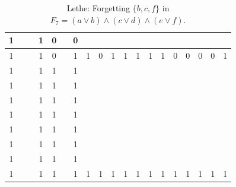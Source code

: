 \begin{table}[!tb]
\begin{tabular}{|c|c|c|c|c|c|c|c|c|c|c|c|c|c|c|c|c|c|c|}
        \rowcolor{blue!40} 1 &  &  & 1 & 0 &  & 0 &  &  &  &  &  &  &  &  &  &  &  &  \\ \hline
        \rowcolor{blue!40} 1 &  &  & 1 & 0 &  & 1 & 1 & 0 & 1 & 1 & 1 & 1 & 1 & 0 & 0 & 0 & 0 & 1 \\ \hline
        \rowcolor{red!40} 1 &  &  & 1 & 1 &  & 1 &  &  &  &  &  &  &  &  &  &  &  &  \\ \hline
        \rowcolor{red!40} 1 &  &  & 1 & 1 &  & 1 &  &  &  &  &  &  &  &  &  &  &  &  \\ \hline
        \rowcolor{red!40} 1 &  &  & 1 & 1 &  & 1 &  &  &  &  &  &  &  &  &  &  &  &  \\ \hline
        \rowcolor{red!40} 1 &  &  & 1 & 1 &  & 1 &  &  &  &  &  &  &  &  &  &  &  &  \\ \hline
        \rowcolor{red!40} 1 &  &  & 1 & 1 &  & 1 &  &  &  &  &  &  &  &  &  &  &  &  \\ \hline
        \rowcolor{red!40} 1 &  &  & 1 & 1 &  & 1 &  &  &  &  &  &  &  &  &  &  &  &  \\ \hline
        \rowcolor{red!40} 1 &  &  & 1 & 1 &  & 1 &  &  &  &  &  &  &  &  &  &  &  &  \\ \hline
        \rowcolor{red!40} 1 &  &  & 1 & 1 &  & 1 & 1 & 1 & 1 & 1 & 1 & 1 & 1 & 1 & 1 & 1 & 1 & 1 \\ \hline
    \end{tabular}
    \caption{Lethe: Forgetting $\{b, c, f\}$ in $F_{7} = (a \lor b) \land (c \lor d) \land (e \lor f)$.}
    \label{tab:lethe-F7-bcf}
\end{table}
